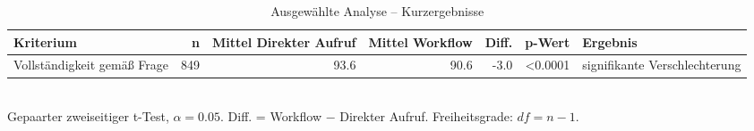\begin{table}[htbp]
\centering
\caption{Ausgewählte Analyse -- Kurzergebnisse}
\begin{tabular}{lrrrrrl}
\toprule
Kriterium & n & Mittel Direkter Aufruf & Mittel Workflow & Diff. & p-Wert & Ergebnis \\
\midrule
Vollständigkeit gemäß Frage & 849 & 93.6 & 90.6 & -3.0 & <0.0001 & signifikante Verschlechterung \\
\bottomrule
\end{tabular}
\\[2mm]
\footnotesize Gepaarter zweiseitiger t-Test, $\alpha=0.05$. Diff. = Workflow $-$ Direkter Aufruf. Freiheitsgrade: $df=n-1$.
\end{table}
